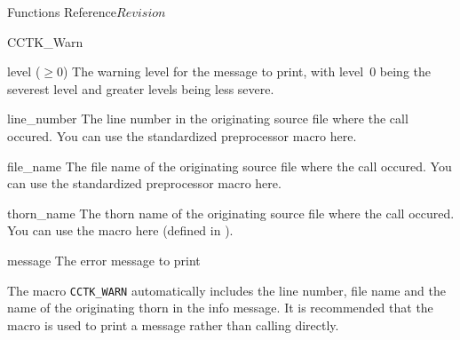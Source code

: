 \begin{cactuspart}{ Functions Reference}{}{$Revision$}
\begin{FunctionDescription}{CCTK\_Warn}
\begin{ParameterSection}
\begin{Parameter}{level ($\ge 0$)}
The warning level for the message to print, with level~0 being the
severest level and greater levels being less severe.
\end{Parameter}
\begin{Parameter}{line\_number}
The line number in the originating source file where the  call
occured. You can use the standardized  preprocessor macro here.
\end{Parameter}
\begin{Parameter}{file\_name}
The file name of the originating source file where the  call
occured. You can use the standardized  preprocessor macro here.
\end{Parameter}
\begin{Parameter}{thorn\_name}
The thorn name of the originating source file where the  call occured. You can use the  macro here (defined in ).
\end{Parameter}
\begin{Parameter}{message}
The error message to print
\end{Parameter}
\end{ParameterSection}

\begin{Discussion}
The macro \verb|CCTK_WARN| automatically includes the line number, file name
and the name of the originating thorn in the
info message. It is recommended that the macro  is used
to print a message rather than calling  directly.
\end{Discussion}


\end{FunctionDescription}
\end{cactuspart}

